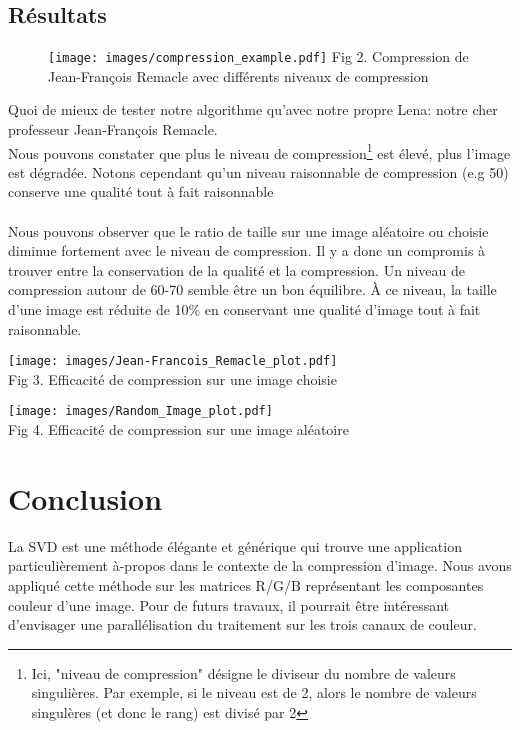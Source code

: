 \documentclass[11pt]{article}
\begin{document}
\subsection*{Résultats}
\begin{figure}
    \centering
    \hspace*{-3cm}
    \texttt{[image: images/compression\_example.pdf]}
    Fig 2. Compression de Jean-François Remacle avec différents niveaux de compression
    \label{fig:example}
\end{figure}
Quoi de mieux de tester notre algorithme qu'avec notre propre Lena: notre cher professeur Jean-François Remacle.\\
Nous pouvons constater que plus le niveau de compression\footnote{Ici, "niveau de compression" désigne le diviseur du nombre de valeurs singulières. Par exemple, si le niveau est de 2, alors le nombre de valeurs singulères (et donc le rang) est divisé par 2} est élevé, plus l'image est dégradée. Notons cependant qu'un niveau raisonnable de compression (e.g 50) conserve une qualité tout à fait raisonnable
\\\\
Nous pouvons observer que le ratio de taille sur une image aléatoire  ou choisie diminue fortement avec le niveau de compression. Il y a donc un compromis à trouver entre la conservation de la qualité et la compression. Un niveau de compression autour de 60-70 semble être un bon équilibre. À ce niveau, la taille d'une image est réduite de 10\% en conservant une qualité d'image tout à fait raisonnable.

\begin{minipage}[b]{0.49\textwidth}
    \centering
    \texttt{[image: images/Jean-Francois\_Remacle\_plot.pdf]}
    \\
    \caption{Fig 3. Efficacité de compression sur une image choisie}
\end{minipage}
\begin{minipage}[b]{0.49\textwidth}
    \texttt{[image: images/Random\_Image\_plot.pdf]}
    \\
    \caption{Fig 4. Efficacité de compression sur une image aléatoire}
\end{minipage}

\section*{Conclusion}
La SVD est une méthode élégante et générique qui trouve une application particulièrement à-propos dans le contexte de la compression d'image. 
Nous avons appliqué cette méthode sur les matrices R/G/B représentant les composantes couleur d'une image.
Pour de futurs travaux, il pourrait être intéressant d'envisager une parallélisation du traitement sur les trois canaux de couleur.
\end{document}
